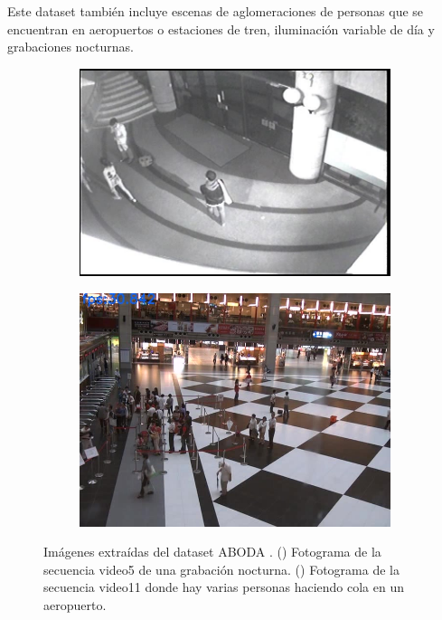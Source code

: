 Este dataset también incluye escenas de aglomeraciones de personas que se encuentran en aeropuertos o estaciones de tren, iluminación variable de día y grabaciones nocturnas.

\begin{figure}[ht]
  \centering
  \begin{subfigure}[b]{0.4\textwidth}
    \includegraphics[width=\textwidth]{img/chapters/resultados/datasets/aboda_3.jpg}
    \caption{}
    \label{fig:aboda_3}
  \end{subfigure}
  \qquad\qquad
  \begin{subfigure}[b]{0.4\textwidth}
    \includegraphics[width=\textwidth]{img/chapters/resultados/datasets/aboda_4.jpg}
    \caption{}
    \label{fig:aboda_4}
  \end{subfigure}
  \caption{Imágenes extraídas del dataset ABODA \cite{aboda-dataset}.
    (\protect{}) Fotograma de la secuencia video5 de una grabación nocturna.
    (\protect{}) Fotograma de la secuencia video11 donde hay varias personas haciendo cola en un aeropuerto.}
  \label{fig:aboda2}
\end{figure}

